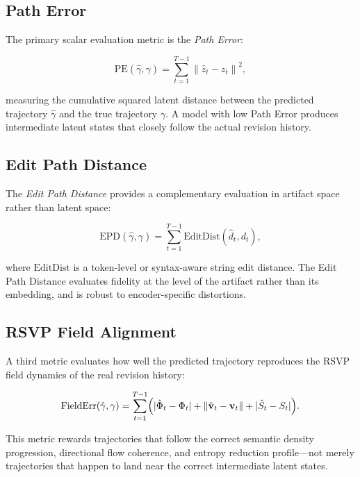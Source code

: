 \documentclass[12pt,a4paper]{article}
\theoremstyle{draftthm}
\newcommand{\traj}{\gamma}
\newcommand{\norm}[1]{\left\|#1\right\|}
\begin{document}
\subsection{Path Error}

The primary scalar evaluation metric is the \emph{Path Error}:

\begin{equation}
  \mathrm{PE}(\hat\traj, \traj)
  =
  \sum_{t=1}^{T-1}
  \norm{\hat{z}_t - z_t}^2,
  \label{eq:path-error}
\end{equation}

measuring the cumulative squared latent distance between the predicted trajectory $\hat\traj$ and the true trajectory $\traj$. A model with low Path Error produces intermediate latent states that closely follow the actual revision history.

\subsection{Edit Path Distance}

The \emph{Edit Path Distance} provides a complementary evaluation in artifact space rather than latent space:

\begin{equation}
  \mathrm{EPD}(\hat\traj, \traj)
  =
  \sum_{t=1}^{T-1}
  \mathrm{EditDist}(\hat{d}_t, d_t),
  \label{eq:epd}
\end{equation}

where $\mathrm{EditDist}$ is a token-level or syntax-aware string edit distance. The Edit Path Distance evaluates fidelity at the level of the artifact rather than its embedding, and is robust to encoder-specific distortions.

\subsection{RSVP Field Alignment}

A third metric evaluates how well the predicted trajectory reproduces the RSVP field dynamics of the real revision history:

\begin{equation}
  \mathrm{FieldErr}(\hat\traj, \traj)
  =
  \sum_{t=1}^{T-1}
  \Bigl(
  |\hat\Phi_t - \Phi_t|
  + \norm{\hat{\mathbf{v}}_t - \mathbf{v}_t}
  + |\hat{S}_t - S_t|
  \Bigr).
  \label{eq:field-error}
\end{equation}

This metric rewards trajectories that follow the correct semantic density progression, directional flow coherence, and entropy reduction profile---not merely trajectories that happen to land near the correct intermediate latent states.
\end{document}
